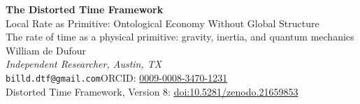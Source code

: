 \documentclass[11pt]{article}
\begin{document}
\thispagestyle{firstpage}

\begin{center}
{\LARGE\bfseries The Distorted Time Framework}\\[7pt]
{\large Local Rate as Primitive: Ontological Economy Without Global Structure}\\[5pt]
{\small The rate of time as a physical primitive: gravity, inertia, and quantum mechanics}\\[6pt]
{\normalsize William de Dufour}\\[2pt]
{\small\itshape Independent Researcher, Austin, TX}\\[2pt]
{\small\texttt{billd.dtf@gmail.com}\quad ORCID: \href{https://orcid.org/0009-0008-3470-1231}{0009-0008-3470-1231}}\\[3pt]
{\small Distorted Time Framework, Version 8: \href{https://doi.org/10.5281/zenodo.21659853}{doi:10.5281/zenodo.21659853}}
\end{center}
\end{document}
